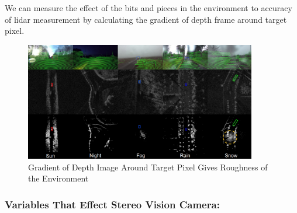 \documentclass[12pt]{article}
\begin{document}
\begin{itemize}
          We can measure the effect of the bits and pieces in the environment to accuracy of lidar measurement by calculating the gradient of depth frame around target pixel.

          \begin{figure}[H]
              \centering
              \includegraphics[width=0.9\textwidth]{LidarViews.png}
              \caption{Gradient of Depth Image Around Target Pixel Gives Roughness of the Environment~\cite{https://doi.org/10.48550/arxiv.2010.09076}}
          \end{figure}
\end{itemize}


\subsubsection*{Variables That Effect Stereo Vision Camera:}
\end{document}

